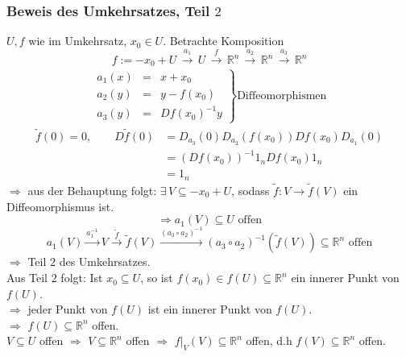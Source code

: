 \subsubsection{Beweis des Umkehrsatzes, Teil $2$} %
\label{ssub:beweis_des_umkehrsatzes_teil_2}
$U,f$ wie im Umkehrsatz, $x_0 \in U$. Betrachte Komposition
\[
	f:= -x_0+U \, \xrightarrow{a_1}\, U \, \xrightarrow{f} \, \mathbb{R}^n \, \xrightarrow{a_2} \, \mathbb{R}^n \, \xrightarrow{a_3} \, \mathbb{R}^n
\]
\begin{align*}
	\left. \begin{array}{rcl}
		a_1(x) & = & x+x_0 \\
		a_2(y) & = & y - f(x_0) \\
		a_3(y) & = & Df(x_0)^{-1}y
	\end{array} \right\} \text{Diffeomorphismen}
\end{align*}
\begin{align*}
	\tilde f(0)=0, \qquad D \tilde f(0) &= D_{a_3}(0)D_{a_2}(f(x_0))Df(x_0)D_{a_1}(0) \\
	&= (Df(x_0))^{-1} 1_n Df(x_0) 1_n  \\
	&= 1_n
\end{align*}
$\Rightarrow$ aus der Behauptung folgt: $\exists\,V \subseteq -x_0+U$, sodass $ \tilde f: V \to \tilde f(V)$ ein Diffeomorphismus ist. \\
\[
	\Rightarrow a_1(V) \subseteq U \text{ offen}
\]
\[
	a_1(V) \xrightarrow{a_1^{-1}} V \xrightarrow{\tilde f} \tilde f(V) \xrightarrow{(a_3 \circ a_2)^{-1}} (a_3 \circ a_2)^{-1}( \tilde f(V)) \subseteq \mathbb{R}^n \text{ offen}
\]
$\Rightarrow$ Teil $2$ des Umkehrsatzes. \\
Aus Teil $2$ folgt: Ist $x_0 \subseteq U$, so ist $f(x_0) \in f(U) \subseteq \mathbb{R}^n$ ein innerer Punkt von $f(U)$. \\
$\Rightarrow$ jeder Punkt von $f(U)$ ist ein innerer Punkt von $f(U)$. \\
$\Rightarrow$ $f(U) \subseteq \mathbb{R}^n$ offen. \\
$V \subseteq U$ offen $\Rightarrow$ $V \subseteq \mathbb{R}^n$ offen $\Rightarrow$ $f  \big|_{V}^{}(V) \subseteq \mathbb{R}^n$ offen, d.h $f(V) \subseteq \mathbb{R}^n$ offen. \bewende
\hphantom{k}
\hphantom{k}
